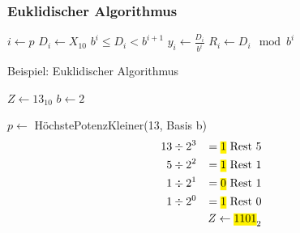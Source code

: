 \documentclass[a4paper]{scrartcl}
\begin{document}
	\subsubsection{Euklidischer Algorithmus}
		\begin{algorithm}[H]
			\DontPrintSemicolon
					
			\nl \( i \gets p \) \;
			\( D_i \gets X_{10} \) \;
			\( b^i \leq D_i < b^{i+1} \) 
			\BlankLine
			\nl \( y_i \gets \frac{D_i}{b^i} \) 
			\( R_i \gets D_i \mod b^i \) \;
			\BlankLine
			\nl {}
		\end{algorithm}
					 
		\begin{algorithm}[H]
			\caption{Beispiel: Euklidischer Algorithmus}
			\DontPrintSemicolon
					 		
			 		\( Z \gets 13_{10} \) 
			 		\( b \gets 2 \) \;
					\BlankLine
					 		
					 \( p \gets \) HöchstePotenzKleiner(13, Basis b) 
					 \BlankLine
					 \begin{align*}
					 	13 &\div 2^3 &= \text{\hl{$ 1 $} Rest } 5 \\
					 	5 &\div 2^2 &= \text{\hl{$ 1 $} Rest } 1 \\
					 	1 &\div 2^1 &= \text{\hl{$ 0 $} Rest } 1 \\
				 		1 &\div 2^0 &= \text{\hl{$ 1 $} Rest } 0 \\
			 			&& Z \gets \text{\hl{$ 1101$}}_2 
			 		\end{align*}
					\end{algorithm}
				 	
\end{document}
